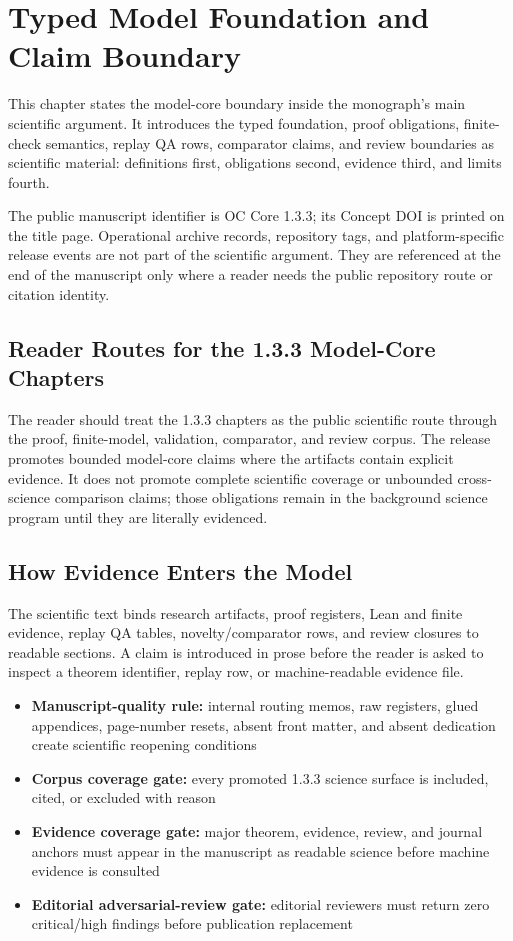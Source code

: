 \section{Typed Model Foundation and Claim Boundary}
\label{sec:oc133-integrated-scientific-closure}
This chapter states the model-core boundary inside the monograph's main scientific argument. It introduces the typed foundation, proof obligations, finite-check semantics, replay QA rows, comparator claims, and review boundaries as scientific material: definitions first, obligations second, evidence third, and limits fourth.

The public manuscript identifier is OC Core 1.3.3; its Concept DOI is printed on the title page. Operational archive records, repository tags, and platform-specific release events are not part of the scientific argument. They are referenced at the end of the manuscript only where a reader needs the public repository route or citation identity.

\subsection{Reader Routes for the 1.3.3 Model-Core Chapters}
The reader should treat the 1.3.3 chapters as the public scientific route through the proof, finite-model, validation, comparator, and review corpus. The release promotes bounded model-core claims where the artifacts contain explicit evidence. It does not promote complete scientific coverage or unbounded cross-science comparison claims; those obligations remain in the background science program until they are literally evidenced.

\subsection{How Evidence Enters the Model}
The scientific text binds research artifacts, proof registers, Lean and finite evidence, replay QA tables, novelty/comparator rows, and review closures to readable sections. A claim is introduced in prose before the reader is asked to inspect a theorem identifier, replay row, or machine-readable evidence file.

\begin{itemize}[leftmargin=1.8em]
\item \textbf{Manuscript-quality rule:} internal routing memos, raw registers, glued appendices, page-number resets, absent front matter, and absent dedication create scientific reopening conditions
\item \textbf{Corpus coverage gate:} every promoted 1.3.3 science surface is included, cited, or excluded with reason
\item \textbf{Evidence coverage gate:} major theorem, evidence, review, and journal anchors must appear in the manuscript as readable science before machine evidence is consulted
\item \textbf{Editorial adversarial-review gate:} editorial reviewers must return zero critical/high findings before publication replacement
\end{itemize}
